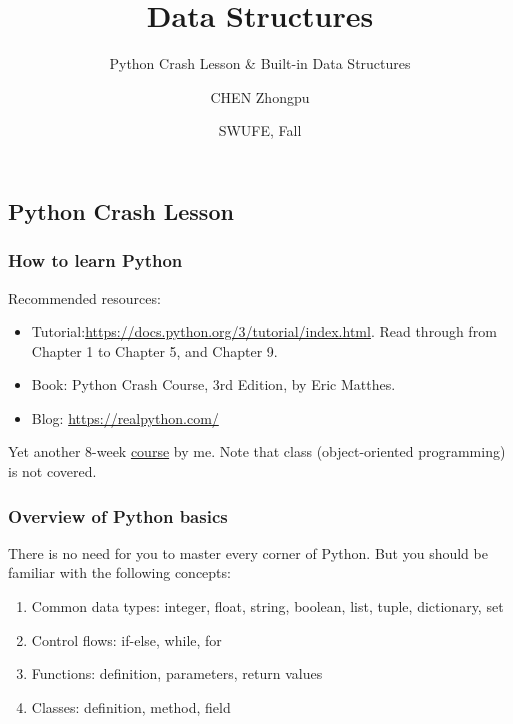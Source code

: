 \documentclass[aspectratio=169, 14pt]{beamer}
\title[Data Structures] %
{Data Structures}
\subtitle{Python Crash Lesson \& Built-in Data Structures}
\author[CHEN Zhongpu] %
{CHEN Zhongpu}
\institute[] %
{
	School of Computing and Artificial Intelligence \\
	\href{mailto:zpchen@swufe.edu.cn}{zpchen@swufe.edu.cn}
}
\date[] %
{SWUFE, Fall \the\year{}}
\begin{document}
\frame{\titlepage}


{
	\begin{frame}
		\section{\textcolor{darkmidnightblue}{Python Crash Lesson}}
	\end{frame}
}

\begin{frame}
	\frametitle{How to learn Python}
	Recommended resources:

	\begin{itemize}
		\item {} Tutorial:\url{https://docs.python.org/3/tutorial/index.html}. Read through from Chapter 1 to Chapter 5, and Chapter 9.
		\item {} Book: Python Crash Course, 3rd Edition, by Eric Matthes.
		\item {} Blog: \url{https://realpython.com/}
	\end{itemize}
	Yet another 8-week \href{https://github.com/ChenZhongPu/python-swufe}{course} by me. Note that \alert{class} (object-oriented programming) is not covered.

\end{frame}

\begin{frame}
	\frametitle{Overview of Python basics}
	There is no need for you to master every corner of Python. But you should be familiar with the following concepts:
	\begin{enumerate}
		\item \alert{Common data types}: integer, float, string, boolean, list, tuple, dictionary, set
		\item \alert{Control flows}: if-else, while, for
		\item \alert{Functions}: definition, parameters, return values
		\item \alert{Classes}: definition, method, field
	\end{enumerate}
\end{frame}
\end{document}
